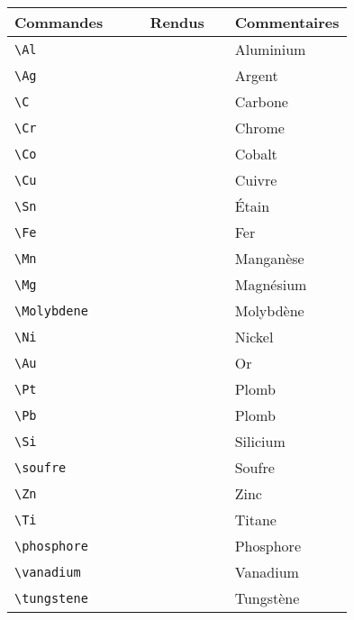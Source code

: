 \documentclass[a4paper,12pt]{article}
\begin{document}
		\begin{tabular}{|p{0.4\linewidth}|p{0.25\linewidth}|p{0.35\linewidth}|}
			\hline
				\textbf{Commandes}&\textbf{Rendus}&\textbf{Commentaires}
			\\\hline\hline
				\verb!\Al!	&	\Al		&	Aluminium
			\\\hline
				\verb!\Ag!	&	\Ag		&	Argent
			\\\hline
				\verb!\C!	&	\C		&	Carbone
			\\\hline
				\verb!\Cr!	&	\Cr		&	Chrome
			\\\hline
				\verb!\Co!	&	\Co		&	Cobalt
			\\\hline
				\verb!\Cu!	&	\Cu		&	Cuivre
			\\\hline
				\verb!\Sn!	&	\Sn		&	Étain
			\\\hline
				\verb!\Fe!	&	\Fe		&	Fer
			\\\hline
				\verb!\Mn!	&	\Mn		&	Manganèse
			\\\hline
				\verb!\Mg!	&	\Mg		&	Magnésium
			\\\hline
				\verb!\Molybdene!	&	\Molybdene		&	Molybdène
			\\\hline
				\verb!\Ni!	&	\Ni		&	Nickel
			\\\hline
				\verb!\Au!	&	\Au		&	Or
			\\\hline
				\verb!\Pt!	&	\Pt		&	Plomb
			\\\hline
				\verb!\Pb!	&	\Pb		&	Plomb
			\\\hline
				\verb!\Si!	&	\Si		&	Silicium
			\\\hline
				\verb!\soufre!	&	\soufre		&	Soufre
			\\\hline
				\verb!\Zn!	&	\Zn		&	Zinc
			\\\hline
				\verb!\Ti!	&	\Ti		&	Titane
			\\\hline
				\verb!\phosphore!&	\phosphore		&	Phosphore
			\\\hline
				\verb!\vanadium!&	\vanadium		&	Vanadium
			\\\hline
				\verb!\tungstene!&	\tungstene		&	Tungstène
			\\\hline
		\end{tabular}
\end{document}
